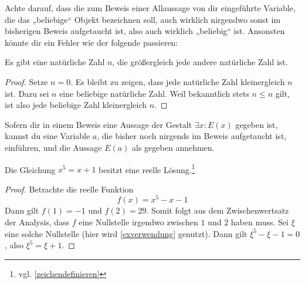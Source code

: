 \begin{bem}[*]
    Achte darauf, dass die zum Beweis einer Allaussage von dir eingeführte Variable, die das „beliebige“ Objekt bezeichnen soll, auch wirklich nirgendwo sonst im bisherigen Beweis aufgetaucht ist, also auch wirklich „beliebig“ ist. Ansonsten könnte dir ein Fehler wie der folgende passieren:
    \begin{bsp}[*]
        Es gibt eine natürliche Zahl $n$, die größergleich jede andere natürliche Zahl ist.
    \end{bsp}
    \begin{proof}\let\qed\relax
        Setze $n=0$. Es bleibt zu zeigen, dass jede natürliche Zahl kleinergleich $n$ ist. Dazu sei $n$ eine beliebige natürliche Zahl. Weil bekanntlich stets $n\le n$ gilt, ist also jede beliebige Zahl kleinergleich $n$.
    \end{proof}
\end{bem}


\begin{axiom} \label{exverwendung}
    Sofern dir in einem Beweis eine Aussage der Gestalt $\exists x: E(x)$ gegeben ist, kannst du eine Variable $a$, die bisher noch nirgends im Beweis aufgetaucht ist, einführen, und die Aussage $E(a)$ als gegeben annehmen.
\end{axiom}
  
  
\begin{bsp} \label{bsp:exverwendung}
    Die Gleichung $x^5=x+1$ besitzt eine reelle Lösung.\footnote{vgl. \cref{zeichendefinieren}}
\end{bsp}
\begin{proof}
    Betrachte die reelle Funktion
        \[ f(x) = x^5-x-1 \]
    Dann gilt $f(1)=-1$ und $f(2)=29$. Somit folgt aus dem Zwischenwertsatz der Analysis, dass $f$ eine Nullstelle irgendwo zwischen $1$ und $2$ haben muss. Sei $\xi$ eine solche Nullstelle (hier wird \cref{exverwendung} genutzt). Dann gilt $\xi^5-\xi-1=0$, also $\xi^5=\xi +1$.
\end{proof}


